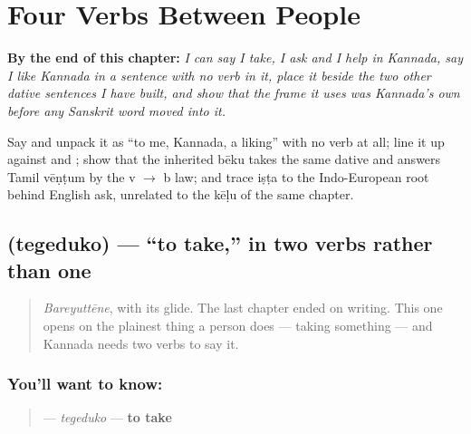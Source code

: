 
\chapter{Four Verbs Between People}
\label{ch:ka-social-verbs}

\begin{chapteropening}
\textbf{By the end of this chapter:} \emph{I can say I take, I ask and I help in Kannada, say I like Kannada in a sentence with no verb in it, place it beside the two other dative sentences I have built, and show that the frame it uses was Kannada’s own before any Sanskrit word moved into it.}

Say    and unpack it as “to me, Kannada, a liking” with no verb at all; line it up against   and  ; show that the inherited bēku takes the same dative and answers Tamil vēṇṭum by the v $\to$ b law; and trace iṣṭa to the Indo-European root behind English ask, unrelated to the kēḷu of the same chapter.
\end{chapteropening}

\section[\texorpdfstring{\kn{ತೆಗೆದುಕೊ} (tegeduko)}{ತೆಗೆದುಕೊ (tegeduko)}]{ (tegeduko) — \textquotedblleft{}to take,\textquotedblright{} in two verbs rather than one}

\label{lesson:KA-C34-tegeduko}



\begin{quote}
\emph{Bareyuttēne}, with its glide. The last chapter ended on writing. This one opens on the plainest thing a person does — taking something — and Kannada needs two verbs to say it.
\end{quote}

\subsection*{You'll want to know: }
\begin{quote}
\textbf{} — \emph{tegeduko} — \textbf{to take}
\end{quote}

